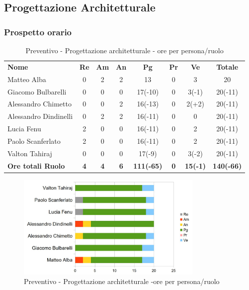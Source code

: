 \newpage
\subsection{Progettazione Architetturale}
\subsubsection{Prospetto orario}

\begin{table} [h!]
	\begin{center}
		\begin{tabular} { m{3.5cm} c c c c c c c }
			\rowcolor{lightgray}
			\textbf{Nome} & \textbf{Re} & \textbf{Am} & \textbf{An} & \textbf{Pg} & \textbf{Pr} & \textbf{Ve} & \textbf{Totale} \\
			Matteo Alba & 0 & 2 & 2 & 13 & 0 & 3 & 20 \\
			Giacomo Bulbarelli & 0 & 0 & 0 & 17(-10) & 0 & 3(-1) & 20(-11) \\
			Alessandro Chimetto & 0 & 0 & 2 & 16(-13) & 0 & 2(+2) & 20(-11) \\
			Alessandro Dindinelli & 0 & 2 & 2 & 16(-11) & 0 & 0 & 20(-11) \\
			Lucia Fenu & 2 & 0 & 0 & 16(-11) & 0 & 2 & 20(-11) \\
			Paolo Scanferlato & 2 & 0 & 0 & 16(-11) & 0 & 2 & 20(-11) \\
			Valton Tahiraj & 0 & 0 & 0 & 17(-9) & 0 & 3(-2) & 20(-11)\\
			\textbf{Ore totali Ruolo} & \textbf{4} & \textbf{4} & \textbf{6} & \textbf{111(-65)} & \textbf{0}& \textbf{15(-1)} & \textbf{140(-66)}
		\end{tabular}
		\caption{Preventivo - Progettazione architetturale - ore per persona/ruolo}
	\end{center}
\end{table}

\begin{figure} [h!]
	\centering
	\includegraphics[width=0.8\textwidth]{res/img/grafici/ProgettazioneArchitetturaleOre.jpg}
	\caption{Preventivo - Progettazione architetturale -ore per persona/ruolo} 
\end{figure}

